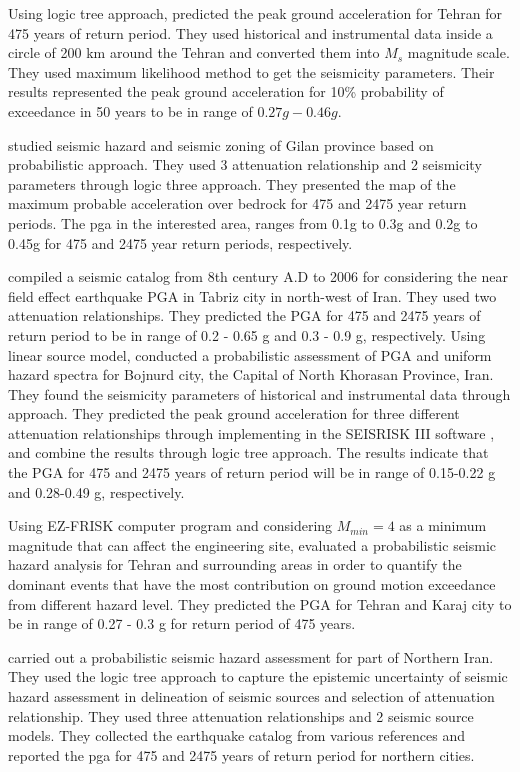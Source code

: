 \noindent
Using logic tree approach,\citet{Ghodrati2003} predicted the peak ground acceleration for Tehran for 475 years of return period. They used historical and instrumental data inside a circle of 200 km around the Tehran and converted them into $M_s$ magnitude scale. They used maximum likelihood method to get the seismicity parameters. Their results represented the peak ground acceleration for 10\% probability of exceedance in 50 years to be in range of $0.27g - 0.46g$.

\noindent
\citet{Ghodrati2008} studied seismic hazard and seismic zoning of Gilan province based on probabilistic approach. They used 3 attenuation relationship and 2 seismicity parameters through logic three approach. They presented the map of the maximum probable acceleration over bedrock for 475 and 2475 year return periods. The pga in the interested area, ranges from 0.1g to 0.3g and 0.2g to 0.45g for 475 and 2475 year return periods, respectively. 

\noindent
\citet{Vafaie2011} compiled a seismic catalog from 8th century A.D to 2006 for considering the near field effect earthquake PGA in Tabriz city in north-west of Iran. They used two attenuation relationships. They predicted the PGA for 475 and 2475 years of return period to be in range of 0.2 - 0.65 g and 0.3 - 0.9 g, respectively.  
\noindent
Using linear source model,\citet{Rahgozar2012} conducted a probabilistic assessment of PGA and uniform hazard spectra for Bojnurd city, the Capital of North Khorasan Province, Iran. They found the seismicity parameters of historical and instrumental data through \citet{Kijko2000} approach. They predicted the peak ground acceleration for three different attenuation relationships through implementing in the SEISRISK III software \citep{Bender1982}, and combine the results through logic tree approach. 
The results indicate that the PGA for 475 and 2475 years of return period will be in range of 0.15-0.22 g and 0.28-0.49 g, respectively.

\noindent
Using  EZ-FRISK computer program and considering $M_{min} = 4$ as a minimum magnitude that can affect the engineering site, \citet{Abdi2013} evaluated a probabilistic seismic hazard analysis for Tehran and surrounding areas in order to quantify the dominant events that have the most contribution on ground motion exceedance from different hazard level. They predicted the PGA for Tehran and Karaj city to be in range of 0.27 - 0.3 g for return period of 475 years. 

\noindent
\citet{Abdollahzadeh2014a} carried out a probabilistic seismic hazard assessment for part of Northern Iran. They used the logic tree approach to capture the epistemic uncertainty of seismic hazard assessment in delineation of seismic sources and selection of attenuation relationship. They used three attenuation relationships and 2 seismic source models. They collected the earthquake catalog from various references and reported the pga for 475 and 2475 years of return period for northern cities.   

